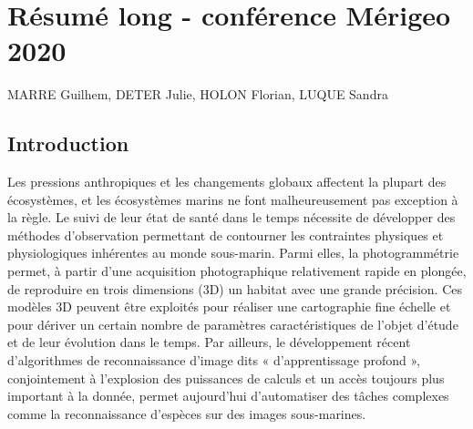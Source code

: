 
\chapter{Résumé long - conférence Mérigeo 2020} \label{merigeo}

\newpage
\newpage

\normalsize
\medskip

\noindent MARRE Guilhem, DETER Julie, HOLON Florian, LUQUE Sandra
\medskip



\section*{Introduction}

Les pressions anthropiques et les changements globaux affectent la plupart des écosystèmes, et les écosystèmes marins ne font malheureusement pas exception à la règle. Le suivi de leur état de santé dans le temps nécessite de développer des méthodes d’observation permettant de contourner les contraintes physiques et physiologiques inhérentes au monde sous-marin. Parmi elles, la photogrammétrie permet, à partir d’une acquisition photographique relativement rapide en plongée, de reproduire en trois dimensions (3D) un habitat avec une grande précision. Ces modèles 3D peuvent être exploités pour réaliser une cartographie fine échelle et pour dériver un certain nombre de paramètres caractéristiques de l’objet d’étude et de leur évolution dans le temps. Par ailleurs, le développement récent d’algorithmes de reconnaissance d’image dits « d’apprentissage profond », conjointement à l’explosion des puissances de calculs et un accès toujours plus important à la donnée, permet aujourd’hui d’automatiser des tâches complexes comme la reconnaissance d’espèces sur des images sous-marines.

